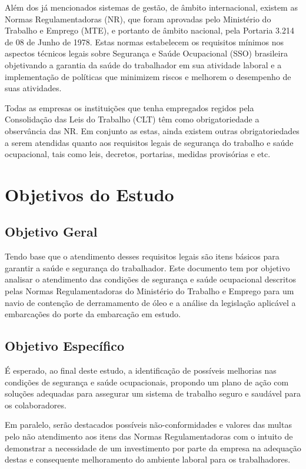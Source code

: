 Além dos já mencionados sistemas de gestão, de âmbito internacional, existem as Normas Regulamentadoras (NR), que foram aprovadas pelo Ministério do Trabalho e Emprego (MTE), e portanto de âmbito nacional, pela Portaria 3.214 de 08 de Junho de 1978. Estas normas estabelecem os requisitos mínimos nos aspectos técnicos legais sobre Segurança e Saúde Ocupacional (SSO) brasileira objetivando a garantia da saúde do trabalhador em sua atividade laboral e a implementação de políticas que minimizem riscos e melhorem o desempenho de suas atividades.

Todas as empresas os instituições que tenha empregados regidos pela Consolidação das Leis do Trabalho (CLT) têm como obrigatoriedade a observância das NR. Em conjunto as estas, ainda existem outras obrigatoriedades a serem atendidas quanto aos requisitos legais de segurança do trabalho e saúde ocupacional, tais como leis, decretos, portarias, medidas provisórias e etc.

\section{Objetivos do Estudo}
\subsection{Objetivo Geral}
Tendo base que o atendimento desses requisitos legais são itens básicos para garantir a saúde e segurança do trabalhador. Este documento tem por objetivo analisar o atendimento das condições de segurança e saúde ocupacional descritos pelas Normas Regulamentadoras do Ministério do Trabalho e Emprego para um navio de contenção de derramamento de óleo e a análise da legislação aplicável a embarcações do porte da embarcação em estudo.
\subsection{Objetivo Específico}
É esperado, ao final deste estudo, a identificação de possíveis melhorias nas condições de segurança e saúde ocupacionais, propondo um plano de ação com soluções adequadas para assegurar um sistema de trabalho seguro e saudável para os colaboradores.

Em paralelo, serão destacados possíveis não-conformidades e valores das multas pelo não atendimento aos itens das Normas Regulamentadoras com o intuito de demonstrar a necessidade de um investimento por parte da empresa na adequação destas e consequente melhoramento do ambiente laboral para os trabalhadores.

